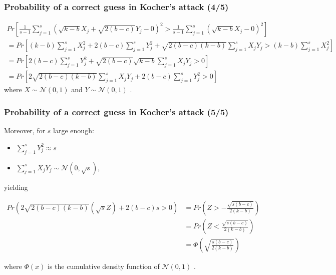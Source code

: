 \documentclass{beamer}
\begin{document}
\begin{frame}
\frametitle{Probability of a correct guess in Kocher's attack (4/5)}

{\scriptsize
\begin{gather*}
Pr \left[
  \frac{1}{s - 1}
  \sum\limits_{j = 1}^{s} \left(
    \sqrt{k - b} X_j  + \sqrt{2(b - c)} Y_j - 0
  \right)^2
  > \frac{1}{s - 1}\sum\limits_{j = 1}^{s} \left(
    \sqrt{k - b} X_j - 0
  \right)^2
\right] \\
= Pr \left[
  (k - b) \sum\limits_{j = 1}^{s} X_j^2
  + 2(b - c) \sum\limits_{j = 1}^{s} Y_j^2
  + \sqrt{2(b - c)(k - b)} \sum\limits_{j = 1}^{s} X_j Y_j
  > (k - b) \sum\limits_{j = 1}^{s} X_j^2
\right] \\
= Pr \left[
  2(b - c) \sum\limits_{j = 1}^{s} Y_j^2
  + \sqrt{2(b - c)}\sqrt{k - b} \sum\limits_{j = 1}^{s} X_j Y_j
  > 0
\right] \\
= Pr \left[
  2 \sqrt{ 2(b - c)(k - b) } \sum\limits_{j = 1}^{s} X_j Y_j
  + 2(b - c) \sum\limits_{j = 1}^{s} Y_j^2 > 0
\right]
\end{gather*}
}
where {\scriptsize $X \sim \mathcal{N}(0, 1)$ } and {\scriptsize $Y \sim \mathcal{N}(0, 1)$ }.
\end{frame}
\begin{frame}
\frametitle{Probability of a correct guess in Kocher's attack (5/5)}
Moreover, for $s$ large enough:
{\scriptsize
  \begin{itemize}
    \item $\sum_{j = 1}^{s}Y_j^2 \approx s$
    \item $\sum_{j = 1}^{s}X_jY_j \sim \mathcal{N}(0, \sqrt{s})$,
  \end{itemize}
}
yielding

{\scriptsize
  \begin{align*}
  Pr \left(
    2\sqrt{2(b - c)(k - b)} \left( \sqrt{s} Z \right)
      + 2(b - c)s > 0
  \right) &= Pr \left(
    Z > - \frac{ \sqrt{s(b - c)} }{2(k - b)}
  \right) \\
  &= Pr \left(
    Z < \frac{\sqrt{s(b - c)}}{2(k - b)}
  \right) \\
  &= \Phi \left( \sqrt{ \frac{s(b - c)}{2(k - b)} } \right)
  \end{align*}
}

where {\scriptsize $\Phi(x)$ } is the cumulative density function of {\scriptsize $\mathcal{N}(0, 1)$ }.

\end{frame}
\end{document}
